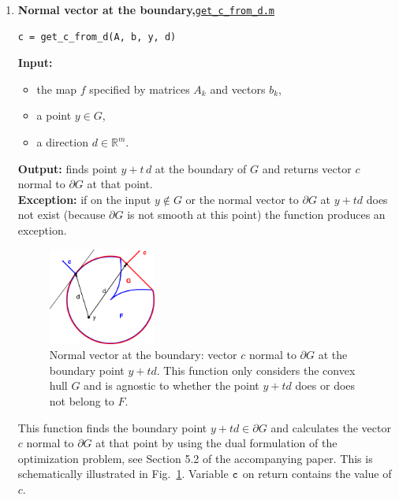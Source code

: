 \documentclass[a4paper]{article}
\newcommand{\R}{\mathbb{R}}
\theoremstyle{definition}
\begin{document}
\begin{enumerate}

\item {\bf Normal vector at the boundary,\hskip 6pt}\underline{\tt get\_c\_from\_d.m} 
\begin{verbatim}
c = get_c_from_d(A, b, y, d)
\end{verbatim}
{\bf Input:}
\begin{itemize}
	\item the map $f$ specified by matrices $A_k$ and vectors $b_k$,
	\item a point $y\in G$,
	\item a direction $d\in\R^m$.
\end{itemize}
{\bf Output:}  finds point $y+t\,d$ at the boundary of $G$ and returns vector $c$ normal to $\partial G$ at that point.\\
{\bf Exception:} if on the input $y\notin G$ or the normal vector to $\partial G$ at $y+td$ does not exist (because $\partial G$ is not smooth at this point)  the function produces an exception.


\begin{figure}[H]
	\centering\includegraphics[width=100pt]{fig/get_c_from_d}
\captionsetup{width=.8\linewidth}
	\caption{Normal vector at the boundary: vector $c$ normal to $\partial G$ at the boundary point $y+td$. This function only considers the convex hull $G$ and is agnostic to whether the point $y+td$ does or does not belong to $F$.}
\label{fig:three}
\end{figure}

This function finds the boundary point $y+td\in \partial G$ and calculates the vector $c$ normal to $\partial G$ at that point by using the dual formulation of the optimization problem, see Section 5.2 of the accompanying paper.
This is schematically illustrated in Fig.~\ref{fig:three}. Variable $\tt c$ on return contains the value of $c$.



\end{enumerate}
\end{document}
